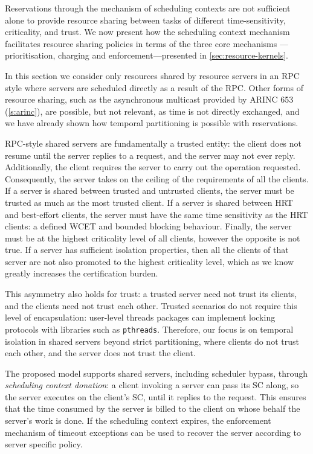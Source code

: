Reservations through the mechanism of scheduling contexts are not sufficient alone to provide
resource sharing between tasks of different time-sensitivity, criticality, and trust. We now
present how the scheduling context mechanism facilitates resource sharing policies 
in terms of the three core mechanisms ---prioritisation, charging and enforcement---presented 
in \cref{sec:resource-kernels}.

In this section we consider only resources shared by resource servers in an \gls{RPC} style where
servers are scheduled directly as a result of the \gls{RPC}. Other forms of resource sharing, such
as the asynchronous multicast provided by ARINC 653 (\cref{s:arinc}), are possible, but not
relevant, as time is not directly exchanged, and we have already shown how temporal partitioning is possible with
reservations. 

RPC-style shared servers are fundamentally a trusted entity: the client does not resume until the
server replies to a request, and the server may not ever reply. Additionally, the client requires the
server to carry out the operation requested. Consequently, the server takes on the ceiling of the
requirements of all the clients. If a server is shared between trusted and untrusted clients, the
server must be trusted as much as the most trusted client. If a server is shared between \gls{HRT}
and best-effort clients, the server must have the same time sensitivity as the HRT clients: a defined 
\gls{WCET} and bounded blocking behaviour. Finally, the server must be at the highest criticality
level of all clients, however the opposite is not true. If a server has sufficient isolation
properties, then all the clients of that server are not also promoted to the
highest criticality level, which as we know greatly increases the certification burden. 

This asymmetry also holds for trust: a trusted server need not trust its clients,
and the clients need not trust each other. 
Trusted scenarios do not require this level of encapsulation: user-level threads packages can implement
locking protocols with libraries such as \texttt{pthreads}. Therefore, our focus is on temporal
isolation in shared servers beyond strict partitioning, where clients do not trust each other, and
the server does not trust the client.

The proposed model supports shared servers, including scheduler
bypass, through \emph{scheduling context
donation}: a client invoking a server can pass its SC along, so the
server executes on the client's SC, until it replies to the
request. This ensures that the time consumed by the server is billed
to the client on whose behalf the server's work is done. If the scheduling context 
expires, the enforcement mechanism of timeout exceptions can be used to recover the server according 
to server specific policy.

